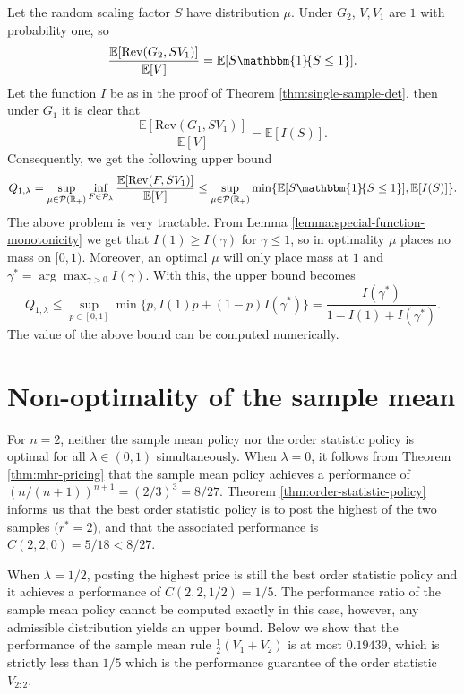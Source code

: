 \documentclass[11pt]{article}
\newcommand{\E}{\mathbb{E}}
\newcommand{\Rplus}{\mathbb{R}_+}
\newcommand{\indicator}[1]{\mathbbm{1}\!\!\left\{#1\right\}}
\newcommand{\Rev}{\mathrm{Rev}}
\begin{document}
Let the random scaling factor $S$ have distribution $\mu$. Under $G_2$, $V,V_1$ are $1$ with probability one, so
$$
\frac{\E[\Rev(G_2,SV_1)]}{\E[V]}=\E[S\indicator{S\le 1}].
$$
Let the function $I$ be as in the proof of Theorem \ref{thm:single-sample-det}, then under $G_1$ it is clear that
$$
\frac{\E[\Rev(G_1,SV_1)]}{\E[V]}=\E[I(S)].
$$
Consequently, we get the following upper bound
$$
Q_{1,\lambda}=\sup_{\mu\in\mathcal{P}(\Rplus)}\inf_{F\in\mathcal{P}_\lambda}\frac{\E[\Rev(F,SV_1)]}{\E[V]}\le \sup_{\mu\in\mathcal{P}(\Rplus)}\min\{\E[S\indicator{S\le 1}],\E[I(S)]\}.
$$
The above problem is very tractable. From Lemma \ref{lemma:special-function-monotonicity} we get that $I(1)\ge I(\gamma)$ for $\gamma\le 1$, so in optimality $\mu$ places no mass on $[0,1)$. Moreover, an optimal $\mu$ will only place mass at $1$ and $\gamma^*=\arg\max_{\gamma >0}I(\gamma)$. With this, the upper bound becomes 
$$
Q_{1,\lambda}\le \sup_{p\in[0,1]}\min\{p,I(1)p+(1-p)I(\gamma^*)\}=\frac{I(\gamma^*)}{1-I(1)+I(\gamma^*)}.
$$
The value of the above bound can be computed numerically.



\section{Non-optimality of the sample mean}\label{appendix:non-optimality-sample-mean}
For $n=2$, neither the sample mean policy nor the order statistic policy is optimal for all $\lambda \in (0,1)$ simultaneously. When $\lambda=0$, it follows from Theorem \ref{thm:mhr-pricing} that the sample mean policy achieves a performance of $(n/(n+1))^{n+1} = (2/3)^3 = 8/27$.
Theorem \ref{thm:order-statistic-policy} informs us that the best order statistic policy is to post the highest of the two samples ($r^*=2$), and that the associated performance is $C(2,2,0)=5/18<8/27$.

When $\lambda=1/2$, 
posting the highest price is still the best order statistic policy and it achieves a performance of $C(2,2,1/2)=1/5$. The performance ratio of the sample mean policy cannot be computed exactly in this case, however, any admissible distribution yields an upper bound. Below we show that the performance of the sample mean rule $\frac{1}{2}(V_1+V_2)$ is at most $0.19439$, which is strictly less than $1/5$ which is the performance guarantee of the order statistic $V_{2:2}$.
\end{document}
